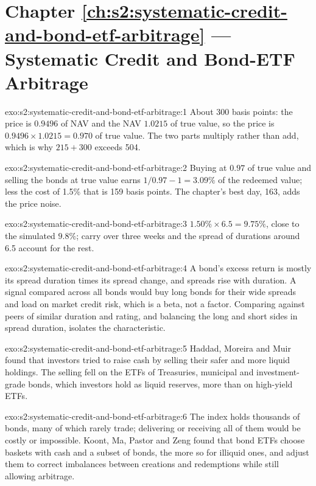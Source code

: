 \section*{Chapter \ref{ch:s2:systematic-credit-and-bond-etf-arbitrage} --- Systematic Credit and Bond-ETF Arbitrage}

\begin{solution}{exo:s2:systematic-credit-and-bond-etf-arbitrage:1}
About 300 basis points: the price is $0.9496$ of NAV and the NAV $1.0215$ of true value, so the price is $0.9496 \times 1.0215 = 0.970$ of true
value. The two parts multiply rather than add, which is why $215 + 300$ exceeds 504.
\end{solution}

\begin{solution}{exo:s2:systematic-credit-and-bond-etf-arbitrage:2}
Buying at $0.97$ of true value and selling the bonds at true value earns $1/0.97 - 1 = 3.09\%$ of the redeemed value; less the cost of 1.5\% that is
159 basis points. The chapter's best day, 163, adds the price noise.
\end{solution}

\begin{solution}{exo:s2:systematic-credit-and-bond-etf-arbitrage:3}
$1.50\% \times 6.5 = 9.75\%$, close to the simulated $9.8\%$; carry over three weeks and the spread of durations around 6.5 account for the rest.
\end{solution}

\begin{solution}{exo:s2:systematic-credit-and-bond-etf-arbitrage:4}
A bond's excess return is mostly its spread duration times its spread change, and spreads rise with duration. A signal compared across all bonds
would buy long bonds for their wide spreads and load on market credit risk, which is a beta, not a factor. Comparing against peers of similar
duration and rating, and balancing the long and short sides in spread duration, isolates the characteristic.
\end{solution}

\begin{solution}{exo:s2:systematic-credit-and-bond-etf-arbitrage:5}
Haddad, Moreira and Muir found that investors tried to raise cash by selling their safer and more liquid holdings. The selling fell on the ETFs of
Treasuries, municipal and investment-grade bonds, which investors hold as liquid reserves, more than on high-yield ETFs.
\end{solution}

\begin{solution}{exo:s2:systematic-credit-and-bond-etf-arbitrage:6}
The index holds thousands of bonds, many of which rarely trade; delivering or receiving all of them would be costly or impossible. Koont, Ma, Pastor
and Zeng found that bond ETFs choose baskets with cash and a subset of bonds, the more so for illiquid ones, and adjust them to correct imbalances
between creations and redemptions while still allowing arbitrage.
\end{solution}

